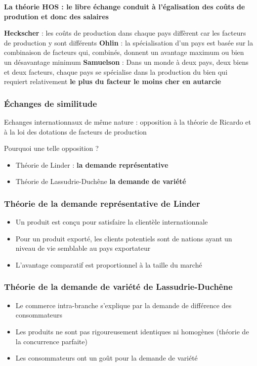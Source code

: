 \textbf{La théorie HOS : le libre échange conduit à l'égalisation des coûts de prodution et donc des salaires} \newline

\textbf{Heckscher} : les coûts de production dans chaque pays diffèrent car les facteurs de production y sont différents
\textbf{Ohlin} : la spécialisation d'un pays est basée sur la combinaison de facteurs qui, combinés, donnent un avantage maximum ou bien un désavantage minimum
\textbf{Samuelson} : Dans un monde à deux pays, deux biens et deux facteurs, chaque pays se spécialise dans la production du bien qui requiert relativement \textbf{le plus du facteur le moins cher en autarcie}

\subsubsection{Échanges de similitude}

Echanges internationnaux de même nature : opposition à la théorie de Ricardo et à la loi des dotations de facteurs de production \newline

Pourquoi une telle opposition ?
\newpage
\begin{itemize}
    \item Théorie de Linder : \textbf{la demande représentative}
    \item Théorie de Lassudrie-Duchêne \textbf{la demande de variété}
\end{itemize}
\subsubsection{Théorie de la demande représentative de Linder}
\begin{itemize}
    \item Un produit est conçu pour satisfaire la clientèle internationnale
    \item Pour un produit exporté, les clients potentiels sont de nations ayant un niveau de vie semblable au pays exportateur
    \item L'avantage comparatif est proportionnel à la taille du marché
\end{itemize}
\subsubsection{Théorie de la demande de variété de Lassudrie-Duchêne}
\begin{itemize}
    \item Le commerce intra-branche s'explique par la demande de différence des consommateurs
    \item Les produits ne sont pas rigoureusement identiques ni homogènes (théorie de la concurrence parfaite)
    \item Les consommateurs ont un goût pour la demande de variété
\end{itemize}

